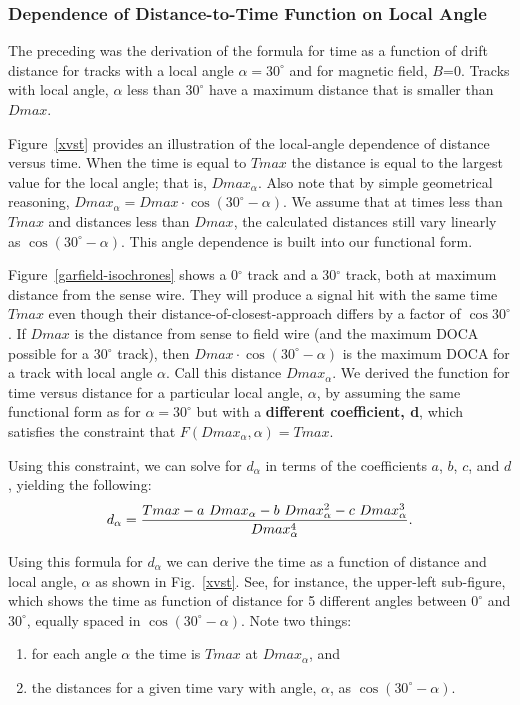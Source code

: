\subsubsection{Dependence of Distance-to-Time Function on Local Angle}

The preceding was the derivation of the formula for time as a function
of drift distance for tracks with a local angle $\alpha = 30^\circ$ and for magnetic field, $B$=0.
Tracks with local angle, $\alpha$ less than $30^\circ$ have a maximum distance that is
smaller than $Dmax$.  

Figure~\ref{xvst} provides an illustration of the local-angle dependence
of distance versus time.  When the time is equal to $Tmax$ the distance is equal to
the largest value for the local angle; that is, $Dmax_{\alpha}$.  Also note that by
simple geometrical reasoning, $Dmax_{\alpha} = Dmax \cdot \cos(30^\circ-\alpha)$.
We assume that at times less than $Tmax$ and distances less than $Dmax$, the calculated
distances still vary linearly as $\cos(30^\circ-\alpha)$.  This angle dependence is built into
our functional form.

Figure~\ref{garfield-isochrones} shows a 0$^\circ$ track and a 30$^\circ$ track, both at maximum
distance from the sense wire. They will produce
a signal hit with the same time $Tmax$ even though their distance-of-closest-approach 
differs by a factor of $\cos 30^\circ$.  If $Dmax$ is the distance from sense to field wire (and the maximum
DOCA possible for a 30$^\circ$ track), then $Dmax\cdot\cos(30^\circ-\alpha)$ is the maximum
DOCA for a track with local angle $\alpha$.  Call this distance $Dmax_{\alpha}$.  
We derived the function for time versus distance for a particular local angle, $\alpha$, by
assuming the same functional form as for $\alpha = 30^\circ$ but 
with a {\bf different coefficient, d}, which 
satisfies the constraint that  $F(Dmax_{\alpha},\alpha) = Tmax$.

Using this constraint, we can solve for $d_{\alpha}$ in terms of the coefficients $a$, $b$, $c$, and $d$,
yielding the following:
\begin{equation}
\label{aalphaequation}
d_{\alpha} = {{Tmax - a ~Dmax_{\alpha} - b ~Dmax_{\alpha}^2 - c ~Dmax_{\alpha}^3}\over{Dmax_{\alpha}^4}}.
\end{equation}

Using this formula for $d_{\alpha}$ we can derive the time as a function of distance and local
angle, $\alpha$ as shown in Fig.~\ref{xvst}.  See, for instance, the upper-left sub-figure, 
which shows the time as function of distance for 5 different angles between $0^\circ$ and 
$30^\circ$, equally spaced in $\cos (30^\circ-\alpha)$.  Note two things:
\begin{enumerate}
\item for each angle $\alpha$ the time is $Tmax$ at $Dmax_{\alpha}$, and
\item the distances for a given time vary with angle, $\alpha$, as $\cos (30^\circ-\alpha)$.
\end{enumerate}

